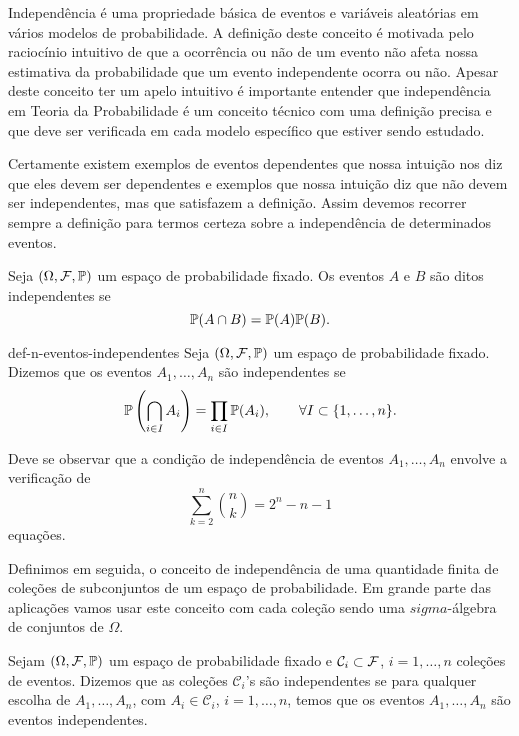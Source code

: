 Independência é uma propriedade básica de eventos e variáveis 
aleatórias em vários modelos de probabilidade. A definição deste
conceito é motivada pelo raciocínio intuitivo de que a ocorrência 
ou não de um evento não afeta nossa estimativa da probabilidade 
que um evento independente ocorra ou não. 
Apesar deste conceito ter um  apelo 
intuitivo é importante entender que independência em Teoria 
da Probabilidade é um conceito técnico com uma definição 
precisa e que deve ser verificada em cada modelo específico
que estiver sendo estudado.
 
Certamente existem exemplos de eventos dependentes que nossa 
intuição nos diz que eles devem ser dependentes e exemplos que 
nossa intuição diz que não devem ser independentes, mas que 
satisfazem a definição. Assim devemos recorrer sempre a definição 
para termos certeza sobre a independência de determinados eventos.  


\begin{definicao}
\label{def-2-eventos-independentes}
%
	Seja $(\Omega,\F,\P)$ um espaço de probabilidade fixado. 
	Os eventos $A$ e $B$ são ditos independentes  se 
		\[
			\P(A\cap B) = \P(A) \P(B).
		\]
%
\end{definicao}
%
%
%
%
%
\begin{definicao}{def-n-eventos-independentes}
Seja $(\Omega,\F,\P)$ um espaço de probabilidade fixado.
Dizemos que os eventos $A_1,\ldots,A_n$ são independentes
se 
	\[
		\P\left( \bigcap_{i\in I} A_i \right)
		=
		\prod_{i\in I} \P(A_i),
		\qquad
		\forall I\subset \{1,\ldots,n\}.
	\]	
\end{definicao}

Deve se observar que a condição de independência 
de eventos $A_1,\ldots,A_n$ envolve a verificação de 
	\[
		\sum_{k=2}^n \binom{n}{k} = 2^n-n-1
	\]
equações. 

Definimos em seguida, o conceito de independência de uma 
quantidade finita de coleções de subconjuntos de um espaço
de probabilidade. Em grande parte das aplicações vamos usar
este conceito com cada coleção sendo uma $sigma$-álgebra 
de conjuntos de $\Omega$. 


\begin{definicao}
\label{def-n-colecoes-independentes}
Sejam $(\Omega,\F,\P)$ um espaço de probabilidade fixado
e $\mathcal{C}_i\subset \F$,  $i=1,\ldots,n$ 
coleções de eventos. 
Dizemos que as coleções $\mathcal{C}_i$'s são independentes
se para qualquer escolha de $A_1,\ldots,A_n$, 
com $A_i\in \mathcal{C}_i$, $i=1,\ldots,n$, temos que 
os eventos $A_1,\ldots,A_n$ são eventos independentes.
\end{definicao}


